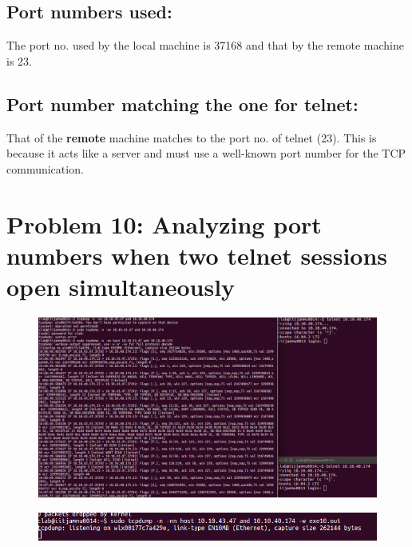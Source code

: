 \documentclass[]{report}
\begin{document}
\subsection{Port numbers used: }
The port no. used by the local machine is 37168 and that by the remote machine is 23.
\subsection{Port number matching the one for telnet: }
That of the \textbf{remote} machine matches to the port no. of telnet (23). This is because it acts like a server and must use a well-known port number for the TCP communication. 

\section{Problem 10: Analyzing port numbers when two telnet sessions open simultaneously}
\begin{figure}[H]
	\vspace{0pt}
	\includegraphics[width=600pt, keepaspectratio, center]{Snapshots/exe10/q10.png}
\end{figure} 
\begin{figure}[H]
	\vspace{0pt}
	\includegraphics[width=600pt, keepaspectratio, center]{Snapshots/exe10/q10_2.png}
\end{figure} 
\end{document}
